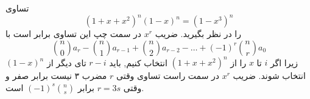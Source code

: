 \p
تساوی
$$(1 + x + x^2)^n(1 - x)^n = (1 - x^3)^n$$
 را در نظر بگیرید. ضریب $x^r$ در سمت چپ این تساوی برابر است با
$${n \choose 0}a_r - {n \choose 1}a_{r - 1} + {n \choose 2}a_{r - 2} - \dots + (-1)^r{n \choose r}a_0$$
زیرا اگر $i$ تا $x$ را از $(1+x+x^2)^n$ انتخاب کنیم, باید $r-i$ تای دیگر از $(1-x)^n$ انتخاب شوند. ضریب $x^r$ در سمت راست تساوی وقتی $r$ مضرب ۳ نیست برابر صفر و وقتی $r = 3s$ برابر $(-1)^s{n \choose s}$ است.